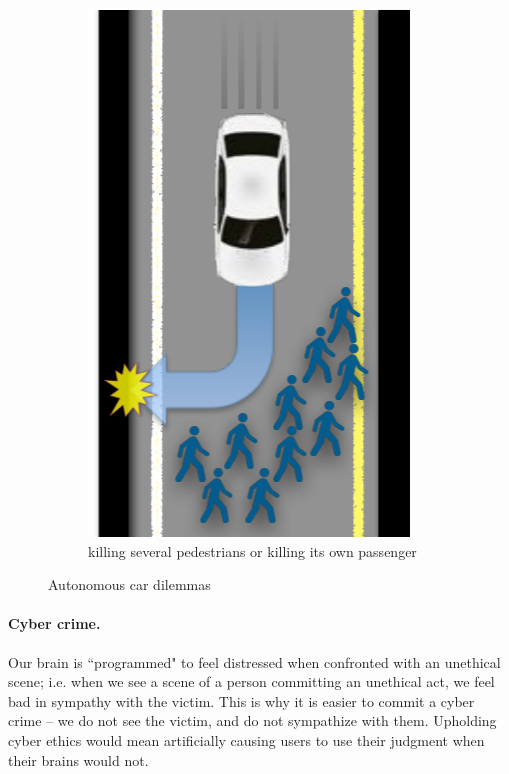 \begin{figure}[!ht]
\begin{subfigure}{0.3\textwidth}
        \includegraphics[width=\textwidth]{images/chapter10/dilemmaC.png}
        \caption{killing several pedestrians or killing its own passenger}
        \label{fig:c}
      \end{subfigure}
    \caption{Autonomous car dilemmas \cite{bonnefon2016social}}\label{fig:AC_dilemmas}
  \end{figure}

\paragraph{Cyber crime.} Our brain is ``programmed" to feel distressed when
confronted with an unethical scene; i.e. when we see a scene of a person
committing an unethical act, we feel bad in sympathy with the victim. This is
why it is easier to commit a cyber crime -- we do not see the victim, and do not
sympathize with them. Upholding cyber ethics would mean artificially causing
users to use their judgment when their brains would not.

